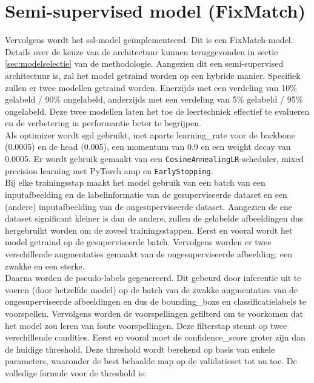 \section{Semi-supervised model (FixMatch)}

Vervolgens wordt het \gls{ssl}-model geïmplementeerd. Dit is een FixMatch-model. Details over de keuze van de architectuur kunnen teruggevonden in sectie \ref{sec:modelselectie} van de methodologie. Aangezien dit een semi-supervised architectuur is, zal het model getraind worden op een hybride manier. Specifiek zullen er twee modellen getraind worden. Enerzijds met een verdeling van 10\% gelabeld / 90\% ongelabeld, anderzijds met een verdeling van 5\% gelabeld / 95\% ongelabeld. Deze twee modellen laten het toe de leertechniek effectief te evalueren en de verbetering in performantie beter te begrijpen. \\

Als optimizer wordt \gls{sgd} gebruikt, met aparte \gls{learning_rate} voor de backbone (0.0005) en de head (0.005), een momentum van 0.9 en een weight decay van 0.0005. Er wordt gebruik gemaakt van een \texttt{CosineAnnealingLR}-scheduler, mixed precision learning met PyTorch \gls{amp} en \texttt{EarlyStopping}. \\

Bij elke trainingsstap maakt het model gebruik van een batch van een inputafbeelding en de labelinformatie van de gesuperviseerde dataset en een (andere) inputafbeelding van de ongesuperviseerde dataset. Aangezien de ene dataset significant kleiner is dan de andere, zullen de gelabelde afbeeldingen dus hergebruikt worden om de zoveel trainingsstappen. Eerst en vooral wordt het model getraind op de gesuperviseerde batch. Vervolgens worden er twee verschillende augmentaties gemaakt van de ongesuperviseerde afbeelding: een zwakke en een sterke. \\

Daarna worden de pseudo-labels gegenereerd. Dit gebeurd door inferentie uit te voeren (door hetzelfde model) op de batch van de zwakke augmentaties van de ongesuperviseerde afbeeldingen en dus de \glspl{bounding_box} en classificatielabels te voorspellen. Vervolgens worden de voorspellingen gefilterd om te voorkomen dat het model zou leren van foute voorspellingen. Deze filterstap steunt op twee verschillende condities. Eerst en vooral moet de \gls{confidence_score} groter zijn dan de huidige threshold. Deze threshold wordt berekend op basis van enkele parameters, waaronder de best behaalde \gls{map} op de validatieset tot nu toe. De volledige formule voor de threshold is:

